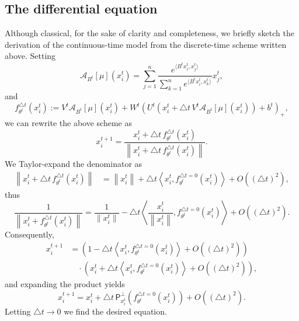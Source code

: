 \documentclass[a4paper,11pt]{article}
\theoremstyle{plain}
\newcommand{\proj}{\bm{\mathsf{P}}^\perp}
\newcommand{\bW}{\bm{\mathit{W}}}
\newcommand{\bV}{\bm{\mathit{V}}}
\newcommand{\bB}{\bm{\mathit{B}}}
\newcommand{\bU}{\bm{\mathit{U}}}
\numberwithin{equation}{section}
\begin{document}
\subsection{The differential equation}
Although classical, for the sake of clarity and completeness, we briefly sketch the derivation of the continuous-time model from the discrete-time scheme written above. 
Setting 
\begin{equation*}
\mathscr{A}_{\bB^t}[\mu](x_i^t) = \sum_{j=1}^n \frac{e^{\langle \bB^t x_i^t, x_j^t\rangle}}{\displaystyle \sum_{k=1}^n e^{\langle \bB^t x_i^t, x_k^t\rangle}}x_j^t,
\end{equation*}
and 
\begin{equation*}
    f_{\theta^t}^{\bigtriangleup t}(x_i^t) := \bV^t\mathscr{A}_{\bB^t}[\mu](x_i^t)+\bW^t\left(\bU^t\left(x_i^t + \bigtriangleup t\,\bV^t\mathscr{A}_{\bB^t}[\mu](x_i^t)\right)+ b^t\right)_+,
\end{equation*}
we can rewrite the above scheme as 
\begin{equation*}
x_i^{t+1} = \frac{x_i^t + \bigtriangleup t\, f_{\theta^t}^{\bigtriangleup t}(x_i^t)}{\left\|x_i^t + \bigtriangleup t\, f_{\theta^t}^{\bigtriangleup t}(x_i^t)\right\|}.
\end{equation*}
We Taylor-expand the denominator as 
\begin{align*}
    \left\|x_i^t + \bigtriangleup t\, f_{\theta^t}^{\bigtriangleup t}(x_i^t)\right\|&=\left\|x_i^t\right\| + \bigtriangleup t\left\langle x_i^t, f^{\bigtriangleup t=0}_{\theta^t}(x_i^t)\right\rangle + O\left(\left(\bigtriangleup t\right)^2\right),
\end{align*}
thus
\begin{equation*}
    \frac{1}{\left\|x_i^t + f_{\theta^t}^{\bigtriangleup t}(x_i^t)\right\|} = \frac{1}{\|x_i^t\|} - \bigtriangleup t\left\langle\frac{x_i^t}{\left\|x_i^t\right\|},f_{\theta^t}^{\bigtriangleup t=0}(x_i^t)\right\rangle+O\left(\left(\bigtriangleup t\right)^2\right).
\end{equation*}
Consequently, 
\begin{align*}
    x_i^{t+1} &= \left(1-\bigtriangleup t\left\langle x_i^t, f^{\bigtriangleup t=0}_{\theta^t}(x_i^t)\right\rangle + O\left(\left(\bigtriangleup t\right)^2\right)\right)\\
    &\quad\cdot\left(x_i^t+\bigtriangleup t\left\langle x_i^t, f^{\bigtriangleup t=0}_{\theta^t}(x_i^t)\right\rangle + O\left(\left(\bigtriangleup t\right)^2\right)\right),
\end{align*}
and expanding the product yields
\begin{equation*}
    x_i^{t+1} = x_i^t + \bigtriangleup t\,\proj_{x_i^t}\left(f_{\theta^t}^{\bigtriangleup t=0}(x_i^t)\right) + O\left(\left(\bigtriangleup t\right)^2\right).
\end{equation*}
Letting $\bigtriangleup t\to0$ we find the desired equation.
\end{document}
